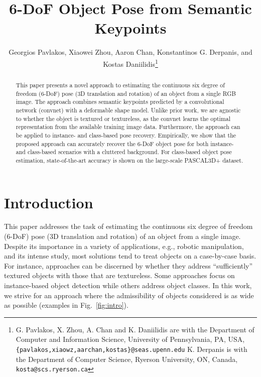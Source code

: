 \documentclass[letterpaper, 10 pt, conference]{ieeeconf}
\title{\LARGE \bf 6-DoF Object Pose from Semantic Keypoints
}
\author{Georgios Pavlakos,  Xiaowei Zhou,  Aaron Chan, Konstantinos G. Derpanis, and Kostas Daniilidis\thanks{G. Pavlakos, X. Zhou, A. Chan and K. Daniilidis are with the  Department of Computer and Information Science, University of Pennsylvania, PA, USA, 
        {\tt\small \{pavlakos,xiaowz,aarchan,kostas\}@seas.upenn.edu}\newline
        K. Derpanis is with the Department of Computer Science, Ryerson University, ON, Canada,
        {\tt\small kosta@scs.ryerson.ca}}
}
\begin{document}
\maketitle
\thispagestyle{empty}
\pagestyle{empty}


\begin{abstract}
This paper presents a novel approach to estimating the continuous six degree of freedom (6-DoF) pose (3D translation and rotation) of an object from a single RGB image. The  approach combines semantic keypoints predicted by a convolutional network (convnet) with a deformable shape model. Unlike prior work, we are agnostic to whether the object is textured or textureless, as the convnet learns the optimal representation from the available training image data. Furthermore, the approach can be applied to instance- and class-based pose recovery. Empirically, we show that the proposed approach can accurately recover the 6-DoF object pose for both instance- and class-based scenarios with a cluttered background. For class-based object pose estimation, state-of-the-art accuracy is shown on the large-scale PASCAL3D+ dataset.
\end{abstract} 
\section{Introduction} 

This paper addresses the task of estimating the continuous six degree of freedom (6-DoF) pose (3D translation and rotation) of an object from a single image.  Despite its importance in a variety of applications, e.g., robotic manipulation, and its intense study, most solutions tend to treat objects on a case-by-case basis.  For instance, approaches can be discerned by whether they address ``sufficiently'' textured objects with those that are textureless.  Some approaches focus on instance-based object detection while others address object classes. In this work, we strive for an approach where the admissibility of objects considered is as wide as possible (examples in Fig.~\ref{fig:intro}).
 
\end{document}
